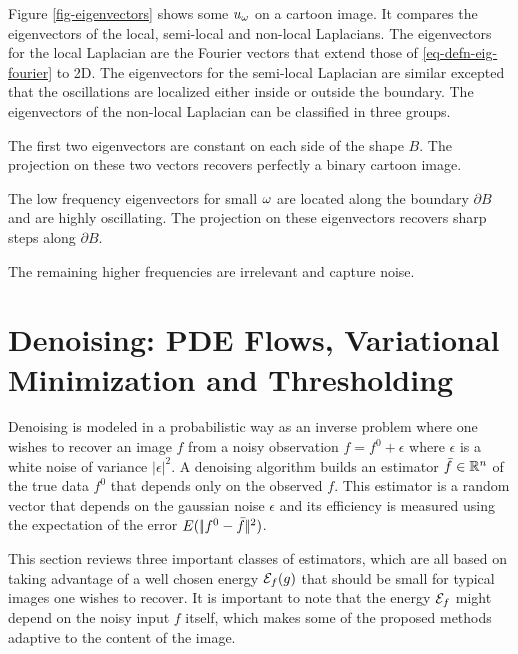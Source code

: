 \documentclass[final]{siamltex}
\newcommand{\F}{f}
\newcommand{\fz}{f^0}
\begin{document}
Figure \ref{fig-eigenvectors} shows some $u_\omega$ on a cartoon image. It compares the eigenvectors of the local, semi-local and non-local Laplacians. The eigenvectors for the local Laplacian are the Fourier vectors that extend those of \eqref{eq-defn-eig-fourier} to 2D. The eigenvectors for the semi-local Laplacian are similar excepted that the oscillations are localized either inside or outside the boundary. The eigenvectors of the non-local Laplacian can be classified in three groups.
\begin{rs}
	\item The first two eigenvectors are constant on each side of the shape $B$. The projection on these two vectors recovers perfectly a binary cartoon image.
	\item The low frequency eigenvectors for small $\omega$  are located along the boundary $\partial B$ and are highly oscillating. The projection on these eigenvectors recovers sharp steps along $\partial B$.
	\item The remaining higher frequencies are irrelevant and capture noise.
\end{rs}


\section{Denoising: PDE Flows, Variational Minimization and Thresholding}

\newcommand{\energy}{\Ee}

Denoising is modeled in a probabilistic way as an inverse problem where one wishes to recover an image $f$ from a noisy observation $\F = \fz + \epsilon$ where $\epsilon$ is a white noise of variance $|\epsilon|^2$. A denoising algorithm builds an estimator $\bar f \in \mathbb{R}^n$ of the true data $\fz$ that depends only on the observed $\F$. This estimator is a random vector that depends on the gaussian noise $\epsilon$ and its efficiency is measured using the expectation of the error $E(\norm{\fz-\bar f}^2)$. 

This section reviews three important classes of estimators, which are all based on taking advantage of a well chosen energy $\energy_{\F}(g)$ that should be small for typical images one wishes to recover. It is important to note that the energy $\energy_{\F}$ might depend on the noisy input $\F$ itself, which makes some of the proposed methods adaptive to the content of the image.
\end{document}
